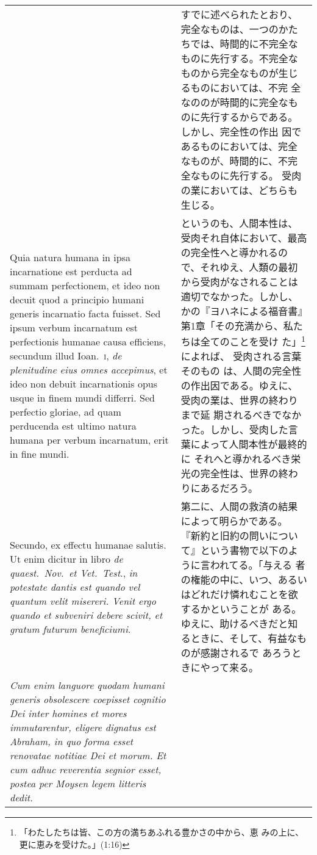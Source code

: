 \documentclass[10pt]{jsarticle} %
\begin{document}
\begin{longtable}{p{21em}p{21em}}
&

すでに述べられたとおり、完全なものは、一つのかたちでは、時間的に不完全な
 ものに先行する。不完全なものから完全なものが生じるものにおいては、不完
 全なののが時間的に完全なものに先行するからである。しかし、完全性の作出
 因であるものにおいては、完全なものが、時間的に、不完全なものに先行する。
受肉の業においては、どちらも生じる。


\\


Quia
natura humana in ipsa incarnatione est perducta ad summam perfectionem,
et ideo non decuit quod a principio humani generis incarnatio facta
fuisset. Sed ipsum verbum incarnatum est perfectionis humanae causa
efficiens, secundum illud Ioan.~{\scshape i}, {\itshape de plenitudine eius omnes accepimus},
et ideo non debuit incarnationis opus usque in finem mundi differri. Sed
perfectio gloriae, ad quam perducenda est ultimo natura humana per
verbum incarnatum, erit in fine mundi. 


&

というのも、人間本性は、受肉それ自体において、最高の完全性へと導かれるの
 で、それゆえ、人類の最初から受肉がなされることは適切でなかった。しかし、
 かの『ヨハネによる福音書』第1章「その充満から、私たちは全てのことを受け
 た」\footnote{「わたしたちは皆、この方の満ちあふれる豊かさの中から、恵
 みの上に、更に恵みを受けた。」(1:16)}によれば、 受肉される言葉そのもの
 は、人間の完全性の作出因である。ゆえに、受肉の業は、世界の終わりまで延
 期されるべきでなかった。しかし、受肉した言葉によって人間本性が最終的に
 それへと導かれるべき栄光の完全性は、世界の終わりにあるだろう。


\\

Secundo, ex effectu humanae
salutis. Ut enim dicitur in libro {\itshape de quaest.~Nov.~et Vet.~Test}., {\itshape in
potestate dantis est quando vel quantum velit misereri. Venit ergo
quando et subveniri debere scivit, et gratum futurum beneficiumi}.



&

第二に、人間の救済の結果によって明らかである。
『新約と旧約の問いについて』という書物で以下のように言われてる。「与える
 者の権能の中に、いつ、あるいはどれだけ憐れむことを欲するかということが
 ある。ゆえに、助けるべきだと知るときに、そして、有益なものが感謝されるで
 あろうときにやって来る。

\\


{\itshape Cum
enim languore quodam humani generis obsolescere coepisset cognitio Dei
inter homines et mores immutarentur, eligere dignatus est Abraham, in
quo forma esset renovatae notitiae Dei et morum. Et cum adhuc reverentia
segnior esset, postea per Moysen legem litteris dedit. 
}



\end{longtable}
\end{document}
